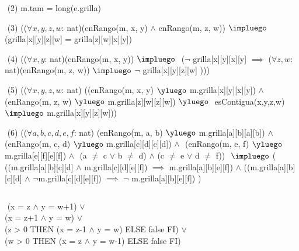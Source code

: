 \begin{Representacion}
$ $\newline
(2)
m.tam = long(e.grilla)

$ $\newline
(3) 
(($\forall x, y, z, w$: nat)(enRango(m, x, y) $\land$ enRango(m, z, w)) $\impluego$ (grilla[x][y][z][w] = grilla[z][w][x][y])

$ $\newline
(4)
(($\forall x, y$: nat)(enRango(m, x, y)) $\impluego$ $ $\newline 
($\neg$ grilla[x][y][x][y] $\implies$
($\forall z, w$: nat)(enRango(m, z, w)) $\impluego$
$\neg$ grilla[x][y][z][w] ))) 

$ $\newline
(5)
(($\forall x, y, z, w$: nat)$ $\newline
((enRango(m, x, y) $\yluego$ m.grilla[x][y][x][y]) $\land$ $ $\newline
(enRango(m, z, w) $\yluego$ m.grilla[z][w][z][w]) $\yluego$ $ $\newline
esContigua(x,y,z,w) $\impluego$ m.grilla[x][y][z][w]))


$ $\newline
(6)
(($\forall a, b, c, d, e, f$: nat)$ $\newline
(enRango(m, a, b) $\yluego$ m.grilla[a][b][a][b]) $\land$ $ $\newline
(enRango(m, c, d) $\yluego$ m.grilla[c][d][c][d]) $\land$ $ $\newline
(enRango(m, e, f) $\yluego$ m.grilla[e][f][e][f]) $\land$ $ $\newline
(a $\neq$ c $\lor$ b $\neq$ d) $\land$ (c $\neq$ e $\lor$ d $\neq$ f)) $ $\newline
$\impluego$ ( $ $\newline
((m.grilla[a][b][c][d] $\land$ m.grilla[c][d][e][f]) $\implies$ m.grilla[a][b][e][f]) $\land $\newline
((m.grilla[a][b][c][d] $\land$ $\neg$m.grilla[c][d][e][f]) $\implies$ $\neg$ m.grilla[a][b][e][f])$ $\newline
)

$ $\newline
{}%

$ $\newline
{}%
{
(x = z $\land$ y = w+1) $\lor$ \\
(x = z+1 $\land$ y = w) $\lor$ \\
(\IF z > 0 THEN (x = z-1 $\land$ y = w) ELSE false FI) $\lor$ \\
(\IF w > 0 THEN (x = z $\land$ y = w-1) ELSE false FI)
} 



\end{Representacion}
